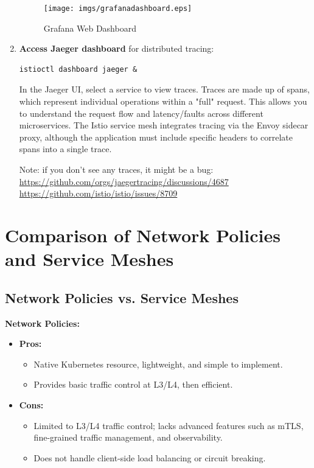 \documentclass{article}
\begin{document}
\begin{enumerate}
\begin{figure}[H]
    \centering
    \texttt{[image: imgs/grafanadashboard.eps]}
    \caption{Grafana Web Dashboard}
\end{figure}

\item \textbf{Access Jaeger dashboard} for distributed tracing:
\begin{lstlisting}
istioctl dashboard jaeger &
\end{lstlisting}
In the Jaeger UI, select a service to view traces. Traces are made up of spans, which represent individual operations within a "full" request. This allows you to understand the request flow and latency/faults across different microservices. The Istio service mesh integrates tracing via the Envoy sidecar proxy, although the application must include specific headers to correlate spans into a single trace.

Note: if you don't see any traces, it might be a bug: \footnotesize\url{https://github.com/orgs/jaegertracing/discussions/4687} \footnotesize\url{https://github.com/istio/istio/issues/8709}
\end{enumerate}

\normalsize

\newpage

\section{Comparison of Network Policies and Service Meshes}

\subsection{Network Policies vs. Service Meshes}
\textbf{Network Policies:}
\begin{itemize}
\item \textbf{Pros:} 
\begin{itemize}
    \item Native Kubernetes resource, lightweight, and simple to implement.
    \item Provides basic traffic control at L3/L4, then efficient.
\end{itemize}
\item \textbf{Cons:} 
\begin{itemize}
    \item Limited to L3/L4 traffic control; lacks advanced features such as mTLS, fine-grained traffic management, and observability.
    \item Does not handle client-side load balancing or circuit breaking.
\end{itemize}
\end{itemize}
\end{document}
